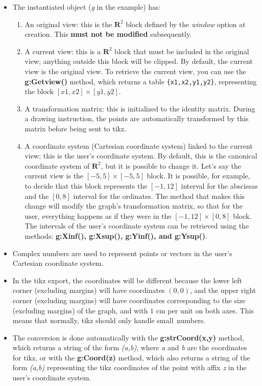 \begin{itemize}
\item The instantiated object (\emph{g} in the example) has:
\begin{enumerate}
\item An original view: this is the $\mathbf R^2$ block defined by the \emph{window} option at creation. This \textbf{must not be modified} subsequently.
\item A current view: this is a $\mathbf R^2$ block that must be included in the original view; anything outside this block will be clipped. By default, the current view is the original view. To retrieve the current view, you can use the \textbf{g:Getview()} method, which returns a table \verb|{x1,x2,y1,y2}|, representing the block $[x1,x2]\times [y1,y2]$.
\item A transformation matrix: this is initialized to the identity matrix. During a drawing instruction, the points are automatically transformed by this matrix before being sent to tikz.
\item A coordinate system (Cartesian coordinate system) linked to the current view; this is the user's coordinate system. By default, this is the canonical coordinate system of $\mathbf R^2$, but it is possible to change it. Let's say the current view is the $[-5,5]\times[-5,5]$ block. It is possible, for example, to decide that this block represents the $[-1,12]$ interval for the abscissas and the $[0,8]$ interval for the ordinates. The method that makes this change will modify the graph's transformation matrix, so that for the user, everything happens as if they were in the $[-1,12]\times [0,8]$ block. The intervals of the user's coordinate system can be retrieved using the methods: \textbf{g:Xinf(), g:Xsup(), g:Yinf(), and g:Ysup()}.
\end{enumerate}
\item Complex numbers are used to represent points or vectors in the user's Cartesian coordinate system.
\item In the tikz export, the coordinates will be different because the lower left corner (excluding margins) will have coordinates $(0,0)$, and the upper right corner (excluding margins) will have coordinates corresponding to the size (excluding margins) of the graph, and with $1$ cm per unit on both axes. This means that normally, tikz should only handle \og small\fg\ numbers. \item The conversion is done automatically with the \textbf{g:strCoord(x,y)} method, which returns a string of the form \emph{(a,b)}, where \emph{a} and \emph{b} are the coordinates for tikz, or with the \textbf{g:Coord(z)} method, which also returns a string of the form \emph{(a,b)} representing the tikz coordinates of the point with affix \emph{z} in the user's coordinate system.
\end{itemize}

